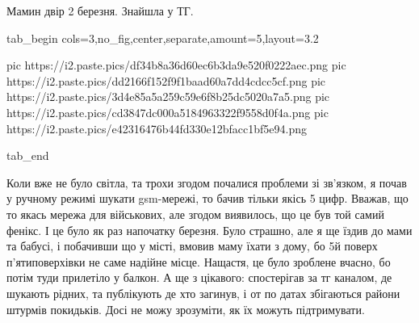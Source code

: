 Мамин двір 2 березня. Знайшла у ТГ.


\ifcmt
  tab_begin cols=3,no_fig,center,separate,amount=5,layout=3.2

     pic https://i2.paste.pics/df34b8a36d60ec6b3da9e520f0222aec.png
		 pic https://i2.paste.pics/dd2166f152f9f1baad60a7dd4cdcc5cf.png
		 pic https://i2.paste.pics/3d4e85a5a259c59e6f8b25dc5020a7a5.png
		 pic https://i2.paste.pics/cd3847dc000a5184963322f9558d0f4a.png
		 pic https://i2.paste.pics/e42316476b44fd330e12bfacc1bf5e94.png

  tab_end
\fi


Коли вже не було світла, та трохи згодом почалися проблеми зі зв'язком, я почав
у ручному режимі шукати gsm-мережі, то бачив тільки якісь 5 цифр. Вважав, що то
якась мережа для військових, але згодом виявилось, що це був той самий фенікс.
І це було як раз напочатку березня. Було страшно, але я ще їздив до мами та
бабусі, і побачивши що у місті, вмовив маму їхати з дому, бо 5й поверх
п'ятиповерхівки не саме надійне місце. Нащастя, це було зроблене вчасно, бо
потім туди прилетіло у балкон. А ще з цікавого: спостерігав за тг каналом, де
шукають рідних, та публікують де хто загинув, і от по датах збігаються райони
штурмів покидьків. Досі не можу зрозуміти, як їх можуть підтримувати.
